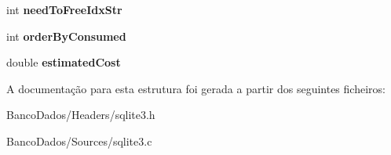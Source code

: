 \begin{DoxyCompactItemize}
\item 
\hypertarget{structsqlite3__index__info_a5410066c067c3891cdf165c70cc4d6b1}{int {\bfseries need\-To\-Free\-Idx\-Str}}\label{structsqlite3__index__info_a5410066c067c3891cdf165c70cc4d6b1}

\item 
\hypertarget{structsqlite3__index__info_a5515d9de0f37f68d7e0930c20a668b29}{int {\bfseries order\-By\-Consumed}}\label{structsqlite3__index__info_a5515d9de0f37f68d7e0930c20a668b29}

\item 
\hypertarget{structsqlite3__index__info_aa8b4fe1d2ee38aab57ba5e1da00d7830}{double {\bfseries estimated\-Cost}}\label{structsqlite3__index__info_aa8b4fe1d2ee38aab57ba5e1da00d7830}

\end{DoxyCompactItemize}


A documentação para esta estrutura foi gerada a partir dos seguintes ficheiros\-:\begin{DoxyCompactItemize}
\item 
Banco\-Dados/\-Headers/sqlite3.\-h\item 
Banco\-Dados/\-Sources/sqlite3.\-c\end{DoxyCompactItemize}
